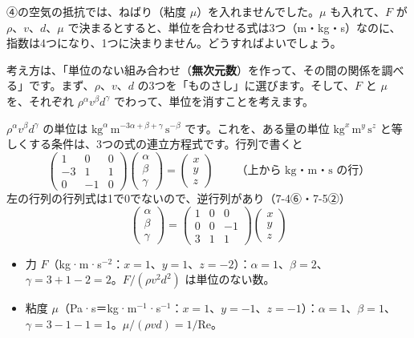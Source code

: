 
\label{ph:力-15:sec6}④の空気の抵抗では、ねばり（粘度 $\mu$）を入れませんでした。$\mu$ も入れて、$F$ が $\rho$、$v$、$d$、$\mu$ で決まるとすると、単位を合わせる式は3つ（m・kg・s）なのに、指数は4つになり、1つに決まりません。どうすればよいでしょう。

考え方は、「単位のない組み合わせ（\textbf{無次元数}）を作って、その間の関係を調べる」です。まず、$\rho$、$v$、$d$ の3つを「ものさし」に選びます。そして、$F$ と $\mu$ を、それぞれ $\rho^{\alpha}v^{\beta}d^{\gamma}$ でわって、単位を消すことを考えます。

$\rho^{\alpha}v^{\beta}d^{\gamma}$ の単位は $\text{kg}^\alpha \,\text{m}^{-3\alpha +\beta +\gamma }\,\text{s}^{-\beta }$ です。これを、ある量の単位 $\text{kg}^{x}\,\text{m}^{y}\,\text{s}^{z}$ と等しくする条件は、3つの式の連立方程式です。行列で書くと
\[\begin{pmatrix}1&0&0\\-3&1&1\\0&-1&0\end{pmatrix}\begin{pmatrix}\alpha \\ \beta \\ \gamma\end{pmatrix}=\begin{pmatrix}x\\y\\z\end{pmatrix}\qquad\text{（上から kg・m・s の行）}\]
左の行列の行列式は1で0でないので、逆行列があり（7-4⑥・7-5②）
\[\begin{pmatrix}\alpha \\ \beta \\ \gamma\end{pmatrix}=\begin{pmatrix}1&0&0\\0&0&-1\\3&1&1\end{pmatrix}\begin{pmatrix}x\\y\\z\end{pmatrix}\]
\begin{itemize}[leftmargin=1.2\zw, itemsep=1pt, topsep=1pt, label={\color{bkTheme}●}]
\item 力 $F$（kg·m·s$^{-2}$：$x=1$、$y=1$、$z=-2$）：$\alpha =1$、$\beta =2$、$\gamma =3+1-2=2$。$F/(\rho v^2d^2)$ は単位のない数。
\item 粘度 $\mu$（Pa·s＝kg·m$^{-1}$·s$^{-1}$：$x=1$、$y=-1$、$z=-1$）：$\alpha =1$、$\beta =1$、$\gamma =3-1-1=1$。$\mu/(\rho vd)=1/\mathrm{Re}$。
\end{itemize}
